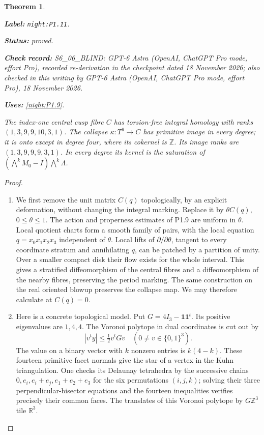 \documentclass[11pt,a4paper]{article}
\newtheorem{theorem}{Theorem}[section]
\theoremstyle{definition}
\newcommand{\StatementRecord}[4]{\par\smallskip\begingroup\upshape\raggedright\noindent\textbf{Label:} \nolinkurl{#1}.\par\noindent\textbf{Status:} #2.\par\noindent\textbf{Check record:} #3.\par\noindent\textbf{Uses:} #4.\par\endgroup\smallskip}
\newcommand{\CurrentChecker}{GPT-6 Astra (OpenAI, ChatGPT Pro mode, effort Pro), 18 November 2026}
\begin{document}
\begin{theorem}\label{night:P1.11}
\StatementRecord{night:P1.11}{proved}{S6\_06\_BLIND: GPT-6 Astra (OpenAI, ChatGPT Pro mode, effort Pro), recorded re-derivation in the checkpoint dated 18 November 2026; also checked in this writing by \CurrentChecker}{\cref{night:P1.9}}
The index-one central cusp fibre $C$ has torsion-free integral homology
with ranks $(1,3,9,9,10,3,1)$.
The collapse $\kappa:T^6\to C$ has primitive image in every degree;
it is onto except in degree four, where its cokernel is $\mathbb Z$.
Its image ranks are $(1,3,9,9,9,3,1)$.
In every degree its kernel is the saturation of
$(\bigwedge^kM_0-I)\bigwedge^k\Lambda$.
\end{theorem}
\begin{proof}
\begin{enumerate}[label=\arabic*.]
\item We first remove the unit matrix $C(q)$ topologically, by an explicit
deformation, without changing the integral marking.  Replace it by
$\theta C(q)$, $0\leq\theta\leq1$.  The action and properness estimates
of P1.9 are uniform in $\theta$.  Local quotient charts form a smooth
family of pairs, with the local equation $q=x_0x_1x_2x_3$ independent
of $\theta$.  Local lifts of $\partial/\partial\theta$, tangent to every
coordinate stratum and annihilating $q$, can be patched by a partition
of unity.  Over a smaller compact disk their flow exists for the whole
interval.  This gives a stratified diffeomorphism of the central
fibres and a diffeomorphism of the nearby fibres, preserving the
period marking.  The same construction on the real oriented blowup
preserves the collapse map.  We may therefore calculate at $C(q)=0$.

\item Here is a concrete topological model.  Put $G=4I_3-\mathbf1\mathbf1^t$.
Its positive eigenvalues are $1,4,4$.  The Voronoi polytope in dual
coordinates is cut out by
\[
|v^ty|\leq \tfrac12v^tGv
 \quad (0\ne v\in\{0,1\}^3).
\]
The value on a binary vector with $k$ nonzero entries is $k(4-k)$.
These fourteen primitive facet normals give the star of a vertex in
the Kuhn triangulation.  One checks its Delaunay tetrahedra by the
successive chains
$0,e_i,e_i+e_j,e_1+e_2+e_3$ for the six permutations $(i,j,k)$;
solving their three perpendicular-bisector equations and the fourteen
inequalities verifies precisely their common faces.  The translates
of this Voronoi polytope by $G\mathbb Z^3$ tile $\mathbb R^3$.


\end{enumerate}
\end{proof}
\end{document}
